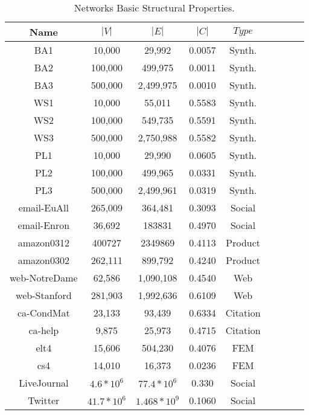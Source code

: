 \documentclass{acm_proc_article-sp}
\begin{document}
\begin{table}
\centering
\caption{Networks Basic Structural Properties.}
\label{table:dataset}
\begin{tabular}{|c|c|c|c|c|c|c|c|c|}
\hline
\textbf{ Name} &   $|V|$   &   $|E|$   &   $|C|$   &   $Type$   \\
\hline
BA1                    & 10,000  & 29,992 & 0.0057   & Synth.  \\
\hline
BA2         	       & 100,000	 & 499,975 & 0.0011   & Synth. \\
\hline
BA3         	       & 500,000	 & 2,499,975 & 0.0010   & Synth.  \\
\hline
WS1                    & 10,000  & 55,011  & 0.5583   & Synth.  \\
\hline
WS2         	       & 100,000	 & 549,735 & 0.5591   & Synth.  \\
\hline
WS3         	       & 500,000	 & 2,750,988 & 0.5582   & Synth.  \\
\hline
PL1                    & 10,000  & 29,990 & 0.0605   & Synth.  \\
\hline
PL2         	       & 100,000	 & 499,965 & 0.0331   & Synth.  \\
\hline
PL3         	       & 500,000	 & 2,499,961 & 0.0319   & Synth.  \\
\hline
email-EuAll            & 265,009	 & 364,481  &0.3093   & Social   \\
\hline
email-Enron            & 36,692	 & 183831&0.4970 & Social  \\
\hline
amazon0312             &400727 	 &2349869  & 0.4113 & Product   \\
\hline
amazon0302             &262,111  & 899,792& 0.4240 & Product   \\
\hline
web-NotreDame          & 62,586	 & 1,090,108 & 0.4540 & Web   \\
\hline
web-Stanford           & 281,903	 & 1,992,636 & 0.6109 & Web  \\
\hline
ca-CondMat               & 23,133	 &  93,439 & 0.6334 & Citation  \\
\hline
ca-help              & 9,875	 & 25,973 & 0.4715 & Citation  \\
\hline
elt4               & 15,606	 & 504,230 & 0.4076 & FEM  \\
\hline
cs4               & 14,010	 & 16,373 & 0.0236 & FEM  \\
\hline
LiveJournal        & $4.6*10^{6}$	 & $77.4*10^{6}$ & 0.330 & Social  \\
\hline
Twitter        & $41.7*10^{6}$	 & $1.468*10^{9}$ & 0.1060 & Social  \\
\hline
\end{tabular}
\end{table}
\par
\end{document}
